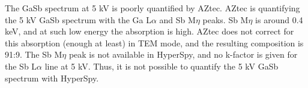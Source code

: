The GaSb spectrum at 5 kV is poorly quantified by AZtec.
AZtec is quantifying the 5 kV GaSb spectrum with the Ga L$\alpha$ and Sb M$\eta$ peaks.
Sb M$\eta$ is around 0.4 keV, and at such low energy the absorption is high.
AZtec does not correct for this absorption (enough at least) in TEM mode, and the resulting composition is 91:9.
The Sb M$\eta$ peak is not available in HyperSpy, and no k-factor is given for the Sb L$\alpha$ line at 5 kV.
Thus, it is not possible to quantify the 5 kV GaSb spectrum with HyperSpy.



